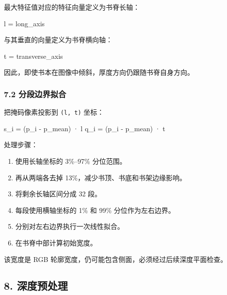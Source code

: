 \documentclass[
  chinese,
  11pt,
  a4paper,
]{article}
\newenvironment{Shaded}{\begin{snugshade}}{\end{snugshade}}
\newcommand{\NormalTok}[1]{#1}
\providecommand{\tightlist}{%
  \setlength{\itemsep}{0pt}\setlength{\parskip}{0pt}}
\begin{document}
最大特征值对应的特征向量定义为书脊长轴：

\begin{Shaded}
\begin{Highlighting}[]
\NormalTok{l = long\_axis}
\end{Highlighting}
\end{Shaded}

与其垂直的向量定义为书脊横向轴：

\begin{Shaded}
\begin{Highlighting}[]
\NormalTok{t = transverse\_axis}
\end{Highlighting}
\end{Shaded}

因此，即使书本在图像中倾斜，厚度方向仍跟随书脊自身方向。

\subsubsection{7.2
分段边界拟合}\label{72-ux5206ux6bb5ux8fb9ux754cux62dfux5408}

把掩码像素投影到 \texttt{(l,\ t)} 坐标：

\begin{Shaded}
\begin{Highlighting}[]
\NormalTok{s\_i = (p\_i {-} p\_mean) · l}
\NormalTok{q\_i = (p\_i {-} p\_mean) · t}
\end{Highlighting}
\end{Shaded}

处理步骤：

\begin{enumerate}
\def\labelenumi{\arabic{enumi}.}
\tightlist
\item
  使用长轴坐标的 3\%--97\% 分位范围。
\item
  再从两端各去掉 13\%，减少书顶、书底和书架边缘影响。
\item
  将剩余长轴区间分成 32 段。
\item
  每段使用横轴坐标的 1\% 和 99\% 分位作为左右边界。
\item
  分别对左右边界执行一次线性拟合。
\item
  在书脊中部计算初始宽度。
\end{enumerate}

该宽度是 RGB 轮廓宽度，仍可能包含侧面，必须经过后续深度平面检查。

\subsection{8. 深度预处理}\label{8-ux6df1ux5ea6ux9884ux5904ux7406}
\end{document}
